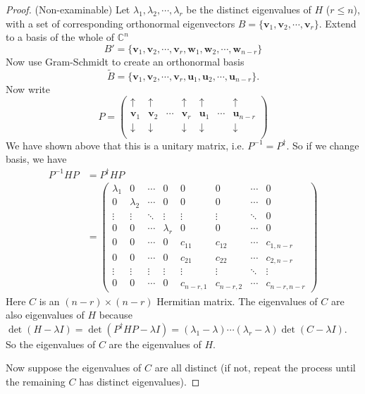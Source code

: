 \documentclass[a4paper]{article}
\theoremstyle{definition}
\newcommand{\mb}[1]{\mathbf{#1}}
\newcommand{\C}{\mathbb{C}}
\begin{document}
\begin{proof}
  (Non-examinable) Let $\lambda_1,\lambda_2, \cdots, \lambda_r$ be the distinct eigenvalues of $H$ ($r \leq n$), with a set of corresponding orthonormal eigenvectors $B = \{\mb{v}_1, \mb{v}_2, \cdots, \mb{v}_r\}$. Extend to a basis of the whole of $\C^n$
\[
B' = \{\mb{v}_1, \mb{v}_2, \cdots, \mb{v}_r, \mb{w}_1, \mb{w}_2,\cdots, \mb{w}_{n - r}\}
\]
Now use Gram-Schmidt to create an orthonormal basis
\[
\tilde{B} = \{\mb{v}_1, \mb{v}_2, \cdots, \mb{v}_r, \mb{u}_1, \mb{u}_2, \cdots, \mb{u}_{n - r}\}.
\]
Now write
\[
P = 
\begin{pmatrix}
  \uparrow & \uparrow & & \uparrow  & \uparrow & & \uparrow\\
  \mb{v}_1 & \mb{v}_2 & \cdots & \mb{v}_r & \mb{u}_1 & \cdots & \mb{u}_{n - r}\\
  \downarrow & \downarrow & & \downarrow  & \downarrow & & \downarrow\\
\end{pmatrix}
\]
We have shown above that this is a unitary matrix, i.e. $P^{-1} = P^\dagger$. So if we change basis, we have
\begin{align*}
  P^{-1}HP &= P^\dagger HP\\
  &= \begin{pmatrix}
    \lambda_1 & 0 & \cdots & 0 & 0 & 0 & \cdots & 0\\
    0 & \lambda_2 & \cdots & 0 & 0 & 0 & \cdots & 0\\
    \vdots & \vdots & \ddots & \vdots & \vdots & \vdots & \ddots & 0\\
    0 & 0 & \cdots & \lambda_r & 0 & 0 & \cdots & 0\\
    0 & 0 & \cdots & 0 & c_{11} & c_{12} & \cdots & c_{1, n - r}\\
    0 & 0 & \cdots & 0 & c_{21} & c_{22} & \cdots & c_{2, n - r}\\
    \vdots & \vdots & \vdots & \vdots & \vdots & \vdots & \ddots & \vdots \\
    0 & 0 & \cdots & 0 & c_{n - r,1} & c_{n - r,2} & \cdots  & c_{n - r, n - r}
  \end{pmatrix}
\end{align*}
Here $C$ is an $(n - r)\times (n - r)$ Hermitian matrix. The eigenvalues of $C$ are also eigenvalues of $H$ because $\det (H - \lambda I) = \det(P^\dagger HP - \lambda I) = (\lambda_1 - \lambda)\cdots (\lambda_r - \lambda)\det (C - \lambda I)$. So the eigenvalues of $C$ are the eigenvalues of $H$.

Now suppose the eigenvalues of $C$ are all distinct (if not, repeat the process until the remaining $C$ has distinct eigenvalues).


\end{proof}
\end{document}
